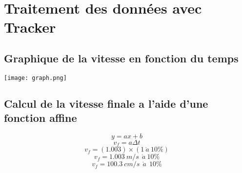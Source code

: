 \documentclass{article}
\begin{document}
        \section{Traitement des données avec Tracker}
            \vspace{4mm}
            \subsection{Graphique de la vitesse en fonction du temps}
                \texttt{[image: graph.png]}
                \vspace{8mm}
            \subsection{Calcul de la vitesse finale a l'aide d'une fonction affine}
                \setcounter{equation}{0}
                \vspace{5mm}
                \begin{equation}
                    y = ax + b
                \end{equation}
                \vspace{5mm}
                \begin{equation}
                    v_f = a \Delta t
                \end{equation}
                \vspace{5mm}
                \begin{equation}
                    v_f = (1.003) \times (1 \ \grave{a} \ 10 \%)
                \end{equation}
                \vspace{5mm}
                \begin{equation}
                    v_f = 1.003 \ m/s \ \ \grave{a} \ 10 \%
                \end{equation}
                \vspace{5mm}
                \begin{equation}
                    v_f = 100.3 \ cm/s \ \ \grave{a} \ \ 10 \%
                \end{equation}
\end{document}
